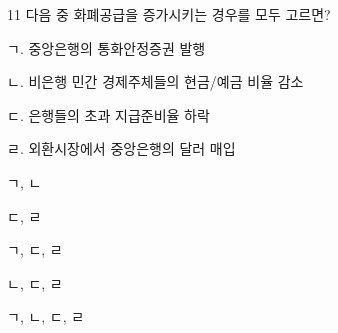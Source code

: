\begin{question}{11}
다음 중 화폐공급을 증가시키는 경우를 모두 고르면?
\begin{framedtext}
ㄱ. 중앙은행의 통화안정증권 발행 \par
ㄴ. 비은행 민간 경제주체들의 현금/예금 비율 감소 \par
ㄷ. 은행들의 초과 지급준비율 하락 \par
ㄹ. 외환시장에서 중앙은행의 달러 매입 \par
\end{framedtext}
\begin{choices}
  \item ㄱ, ㄴ
  \item ㄷ, ㄹ
  \item ㄱ, ㄷ, ㄹ
  \item ㄴ, ㄷ, ㄹ
  \item ㄱ, ㄴ, ㄷ, ㄹ
\end{choices}
\end{question}
